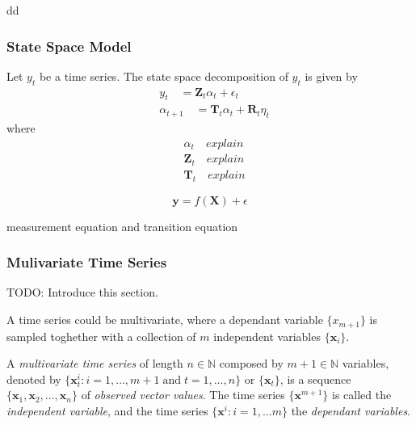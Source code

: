 \begin{example}
dd
\end{example}

\subsubsection{State Space Model}

\begin{definition}
Let $y_t$ be a time series. The state space decomposition of $y_t$ is given by
\begin{align*}
    & y_t          \quad = \mathbf{Z}_t \alpha_t + \epsilon_t \\
    & \alpha_{t+1} \quad = \mathbf{T}_t \alpha_t + \mathbf{R}_t \eta_t
\end{align*}
where
\begin{align*}
    & \alpha_t     \quad explain \\
    & \mathbf{Z}_t \quad explain \\
    & \mathbf{T}_t \quad explain
\end{align*}

\begin{equation}
    \label{eq:measurement_equation}
    \mathbf{y} = f\left( \mathbf{X} \right) + \epsilon
\end{equation}

measurement equation and transition equation

\end{definition}

\subsubsection{Mulivariate Time Series}

{\color{red} TODO: Introduce this section.}

A time series could be multivariate, where a dependant variable $\{ x_{m+1} \}$ is sampled toghether with a collection of $m$ independent variables $\{ \mathbf{x}_i \}$.

\begin{definition}
A \emph{multivariate time series} of length $n \in \mathbb{N}$ composed by $m+1 \in \mathbb{N}$ variables, denoted by $\{ \mathbf{x}^i_t : i=1, \ldots, m+1 \; \text{and} \; t=1, \ldots, n\}$ or $\{ \mathbf{x}_t \}$, is a sequence $\{ \mathbf{x}_1, \mathbf{x}_2, \ldots, \mathbf{x}_n \}$ of \emph{observed vector values}. The time series $\{ \mathbf{x}^{m+1} \}$ is called the \emph{independent variable}, and the time series $\{ \mathbf{x}^i : i=1, \ldots m\}$ the \emph{dependant variables}.
\end{definition}

